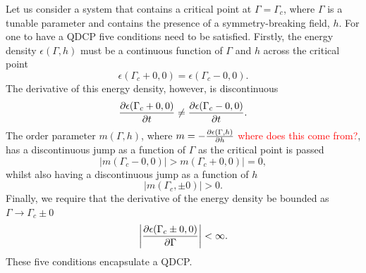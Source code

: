 Let us consider a system that contains a critical point at $\Gamma = \Gamma_c$,
where $\Gamma$ is a tunable parameter and contains the presence of a
symmetry-breaking field, $h$.
For one to have a QDCP five conditions need to be satisfied.
Firstly, the energy density $\epsilon(\Gamma, h)$ must be a continuous function
of $\Gamma$ and $h$ across the critical point
\begin{equation}
    \epsilon(\Gamma_c + 0, 0) = \epsilon(\Gamma_c - 0, 0).
    \label{eq: continuous-energy-cond}
\end{equation}
The derivative of this energy density, however, is discontinuous
\begin{equation}
    \pdv{\epsilon(\Gamma_c + 0, 0)}{t} \neq \pdv{\epsilon(\Gamma_c - 0, 0)}{t}.
\end{equation}
The order parameter $m(\Gamma, h)$, where $m=-\pdv{\epsilon(\Gamma, h)}{h}$
\textcolor{red}{where does this come from?},
has a discontinuous jump as a function of $\Gamma$ as the critical point is
passed
\begin{equation}
    |m(\Gamma_c - 0, 0)| > m(\Gamma_c + 0, 0)| = 0,
\end{equation}
whilst also having a discontinuous jump as a function of $h$
\begin{equation}
    |m(\Gamma_c, \pm 0)| > 0.
\end{equation}
Finally, we require that the derivative of the energy density be bounded as
$\Gamma \rightarrow \Gamma_c \pm 0$
\begin{equation}
    \left|\pdv{\epsilon(\Gamma_c \pm 0, 0)}{\Gamma}\right| < \infty.
    \label{eq: bounded-energy-derivative-cond}
\end{equation}
These five conditions encapsulate a QDCP.



